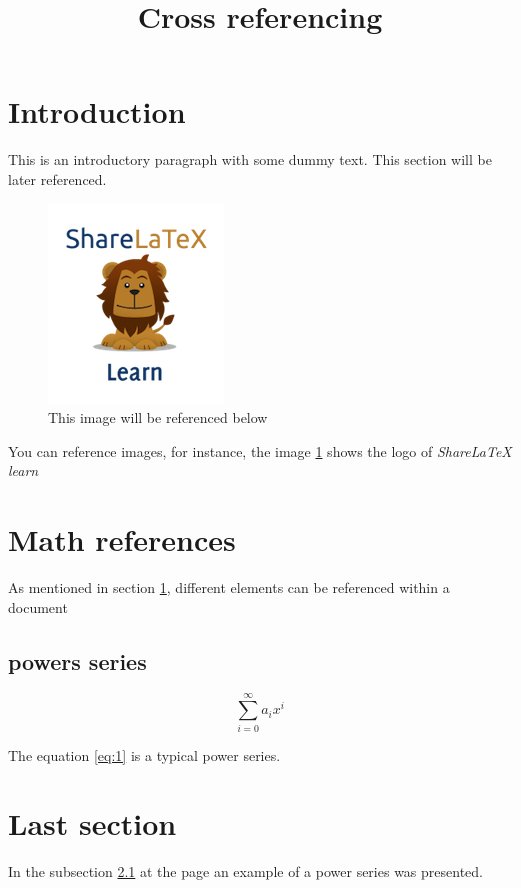 \documentclass{article}
\title{Cross referencing}
\author{ }
\date{ }
\begin{document}
\maketitle
\listoffigures
\newpage

\section{Introduction} \label{introduction}
This is an introductory paragraph with some dummy text. This section will be later referenced.

\begin{figure}[h]
\centering
\includegraphics[width=0.3\linewidth]{lion-logo.png}
\caption{This image will be referenced below}
\label{fig:lion}
\end{figure}

You can reference images, for instance, the image \ref{fig:lion} shows the logo of \textit{ShareLaTeX learn}

\Blindtext

\section{Math references} \label{mathrefs}
As mentioned in section \ref{introduction}, different elements can be referenced within a document

\subsection{powers series} \label{subsection}

\begin{equation} \label{eq:1}
\sum_{i=0}^{\infty} a_i x^i
\end{equation}

The equation \ref{eq:1} is a typical power series.

\Blindtext

\section{Last section}
In the subsection \ref{subsection} at the page \pageref{eq:1} an example of a power series was presented.
\end{document}
